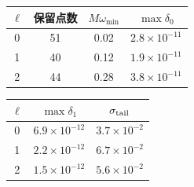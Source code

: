 \documentclass[UTF8,fontset=fandol,11pt,a4paper,oneside]{ctexart}
\numberwithin{equation}{section}
\begin{document}
\noindent\begin{minipage}{\linewidth}
\captionsetup{type=table}\caption{代表性谱尾、离网残差和能流误差。}\label{audit:tab:numerics}
\centering\fontsize{10}{13.5}\selectfont
\setlength{\tabcolsep}{6pt}\renewcommand{\arraystretch}{1.2}
\par{}\par\smallskip
\begin{tabular}{cccc}\toprule
$\ell$ & 保留点数 & $M\omega_{\min}$ & $\max\delta_0$\\\midrule
0 & 51 & 0.02 & $2.8\times10^{-11}$\\
1 & 40 & 0.12 & $1.9\times10^{-11}$\\
2 & 44 & 0.28 & $3.8\times10^{-11}$\\
\bottomrule\end{tabular}
\par\medskip
\par{}\par\smallskip
\begin{tabular}{ccc}\toprule
$\ell$ & $\max\delta_1$ & $\sigma_{\rm tail}$\\\midrule
0 & $6.9\times10^{-12}$ & $3.7\times10^{-2}$\\
1 & $2.2\times10^{-12}$ & $6.7\times10^{-2}$\\
2 & $1.5\times10^{-12}$ & $5.6\times10^{-2}$\\
\bottomrule\end{tabular}
\end{minipage}\par\addvspace{10pt}
\par\addvspace{14pt}
\end{document}
